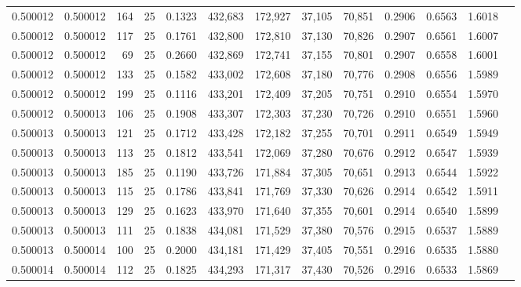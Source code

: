 \begin{tabular}{rrrrrrrrrrrrr}
0.500012 & 0.500012 &   164 &  25 &                                     0.1323 & 432,683 & 172,927 &  37,105 &  70,851 & 0.2906 & 0.6563 & 1.6018 \\
0.500012 & 0.500012 &   117 &  25 &                                     0.1761 & 432,800 & 172,810 &  37,130 &  70,826 & 0.2907 & 0.6561 & 1.6007 \\
0.500012 & 0.500012 &    69 &  25 &                                     0.2660 & 432,869 & 172,741 &  37,155 &  70,801 & 0.2907 & 0.6558 & 1.6001 \\
0.500012 & 0.500012 &   133 &  25 &                                     0.1582 & 433,002 & 172,608 &  37,180 &  70,776 & 0.2908 & 0.6556 & 1.5989 \\
0.500012 & 0.500012 &   199 &  25 &                                     0.1116 & 433,201 & 172,409 &  37,205 &  70,751 & 0.2910 & 0.6554 & 1.5970 \\
0.500012 & 0.500013 &   106 &  25 &                                     0.1908 & 433,307 & 172,303 &  37,230 &  70,726 & 0.2910 & 0.6551 & 1.5960 \\
0.500013 & 0.500013 &   121 &  25 &                                     0.1712 & 433,428 & 172,182 &  37,255 &  70,701 & 0.2911 & 0.6549 & 1.5949 \\
0.500013 & 0.500013 &   113 &  25 &                                     0.1812 & 433,541 & 172,069 &  37,280 &  70,676 & 0.2912 & 0.6547 & 1.5939 \\
0.500013 & 0.500013 &   185 &  25 &                                     0.1190 & 433,726 & 171,884 &  37,305 &  70,651 & 0.2913 & 0.6544 & 1.5922 \\
0.500013 & 0.500013 &   115 &  25 &                                     0.1786 & 433,841 & 171,769 &  37,330 &  70,626 & 0.2914 & 0.6542 & 1.5911 \\
0.500013 & 0.500013 &   129 &  25 &                                     0.1623 & 433,970 & 171,640 &  37,355 &  70,601 & 0.2914 & 0.6540 & 1.5899 \\
0.500013 & 0.500013 &   111 &  25 &                                     0.1838 & 434,081 & 171,529 &  37,380 &  70,576 & 0.2915 & 0.6537 & 1.5889 \\
0.500013 & 0.500014 &   100 &  25 &                                     0.2000 & 434,181 & 171,429 &  37,405 &  70,551 & 0.2916 & 0.6535 & 1.5880 \\
0.500014 & 0.500014 &   112 &  25 &                                     0.1825 & 434,293 & 171,317 &  37,430 &  70,526 & 0.2916 & 0.6533 & 1.5869 \\

\end{tabular}
